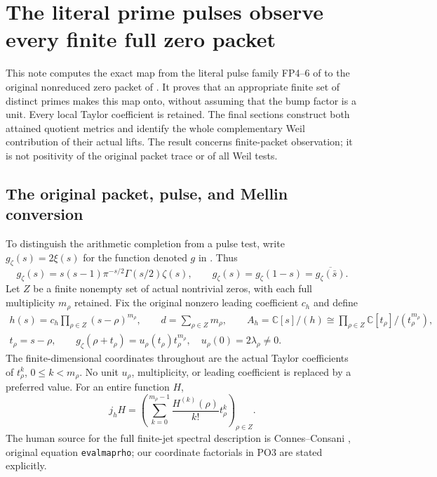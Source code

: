 \documentclass[11pt,a4paper]{article}
\theoremstyle{definition}\newtheorem{definition}[theorem]{Definition}
\newcommand{\C}{\mathbb C}\newcommand{\R}{\mathbb R}
\begin{document}
\section{The literal prime pulses observe every finite full zero packet}



This note computes the exact map from the literal pulse family
FP4--6 of \cite{PO:FP} to the original nonreduced zero packet of
\cite{PO:PL}. It proves that an appropriate finite set of distinct
primes makes this map onto, without assuming that the bump factor
is a unit. Every local Taylor coefficient is retained. The final
sections construct both attained quotient metrics and identify the
whole complementary Weil contribution of their actual lifts.
The result concerns finite-packet observation; it is not positivity
of the original packet trace or of all Weil tests.

\subsection{The original packet, pulse, and Mellin conversion}

To distinguish the arithmetic completion from a pulse test, write
\(g_\zeta(s)=2\xi(s)\) for the function denoted \(g\) in \cite{PO:PL}.
Thus
\[
 g_\zeta(s)=s(s-1)\pi^{-s/2}\Gamma(s/2)\zeta(s),
 \qquad g_\zeta(s)=g_\zeta(1-s)
               =\overline{g_\zeta(\bar s)}.
 \tag{PO1}
\]
Let \(Z\) be a finite nonempty set of actual nontrivial zeros,
with each full multiplicity \(m_\rho\) retained. Fix the original
nonzero leading coefficient \(c_h\) and define
\[
 \begin{gathered}
 h(s)=c_h\prod_{\rho\in Z}(s-\rho)^{m_\rho},\qquad
 d=\sum_{\rho\in Z}m_\rho,\qquad
 A_h=\C[s]/(h)\cong\prod_{\rho\in Z}\C[t_\rho]/(t_\rho^{m_\rho}),\\
 t_\rho=s-\rho,\qquad
 g_\zeta(\rho+t_\rho)=u_\rho(t_\rho)t_\rho^{m_\rho},
 \quad u_\rho(0)=2\lambda_\rho\ne0 .
 \end{gathered}
 \tag{PO2}\label{PO:po:packet}
\]
The finite-dimensional coordinates throughout are the actual
Taylor coefficients of \(t_\rho^k\), \(0\le k<m_\rho\).
No unit \(u_\rho\), multiplicity, or leading coefficient is
replaced by a preferred value. For an entire function \(H\),
\[
 j_hH=\left(\sum_{k=0}^{m_\rho-1}
                    \frac{H^{(k)}(\rho)}{k!}t_\rho^k\right)_{\rho\in Z}.
 \tag{PO3}\label{PO:po:jet}
\]
The human source for the full finite-jet spectral description is
Connes--Consani \cite{PO:CC}, original equation \texttt{evalmaprho};
our coordinate factorials in PO3 are stated explicitly.
\end{document}
